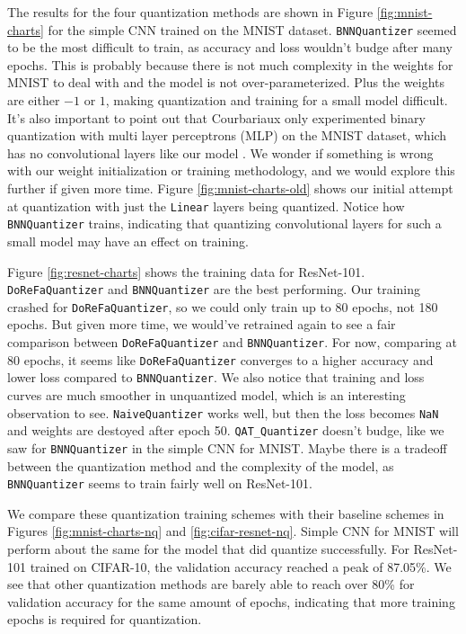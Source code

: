 \documentclass{article}
\begin{document}
The results for the four quantization methods are shown in Figure \ref{fig:mnist-charts} for the simple CNN trained on the MNIST dataset. \verb|BNNQuantizer| seemed to be the most difficult to train, as accuracy and loss wouldn't budge after many epochs. This is probably because there is not much complexity in the weights for MNIST to deal with and the model is not over-parameterized. Plus the weights are either $-1$ or $1$, making quantization and training for a small model difficult. It's also important to point out that Courbariaux only experimented binary quantization with multi layer perceptrons (MLP) on the MNIST dataset, which has no convolutional layers like our model \cite{binarynn}. We wonder if something is wrong with our weight initialization or training methodology, and we would explore this further if given more time. Figure \ref{fig:mnist-charts-old} shows our initial attempt at quantization with just the \verb|Linear| layers being quantized. Notice how  \verb|BNNQuantizer| trains, indicating that quantizing convolutional layers for such a small model may have an effect on training.

Figure \ref{fig:resnet-charts} shows the training data for ResNet-101. \verb|DoReFaQuantizer| and \verb|BNNQuantizer| are the best performing. Our training crashed for \verb|DoReFaQuantizer|, so we could only train up to 80 epochs, not 180 epochs. But given more time, we would've retrained again to see a fair comparison between \verb|DoReFaQuantizer| and \verb|BNNQuantizer|. For now, comparing at 80 epochs, it seems like \verb|DoReFaQuantizer| converges to a higher accuracy and lower loss compared to  \verb|BNNQuantizer|. We also notice that training and loss curves are much smoother in unquantized model, which is an interesting observation to see. \verb|NaiveQuantizer| works well, but then the loss becomes \verb|NaN| and weights are destoyed after epoch 50. \verb|QAT_Quantizer| doesn't budge, like we saw for \verb|BNNQuantizer| in the simple CNN for MNIST. Maybe there is a tradeoff between the quantization method and the complexity of the model, as \verb|BNNQuantizer| seems to train fairly well on ResNet-101. 

We compare these quantization training schemes with their baseline schemes in Figures \ref{fig:mnist-charts-nq} and \ref{fig:cifar-resnet-nq}. Simple CNN for MNIST will perform about the same for the model that did quantize successfully. For ResNet-101 trained on CIFAR-10, the validation accuracy reached a peak of 87.05\%. We see that other quantization methods are barely able to reach over 80\% for validation accuracy for the same amount of epochs, indicating that more training epochs is required for quantization.
\end{document}
